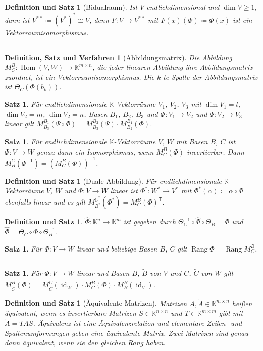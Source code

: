 \documentclass[a4paper]{article}
\newcounter{Sec}
\theoremstyle{marginbreak}
\newtheorem{satz}[definition]{Satz}
\newtheorem{defsatz}[definition]{Definition und Satz}
\newtheorem{defsatzver}[definition]{Definition, Satz und Verfahren}
\DeclareMathOperator{\Rang}{Rang}
\DeclareMathOperator{\Hom}{Hom}
\DeclareMathOperator{\id}{id}
\newcommand{\sep}{%
	\rule{\textwidth}{0.3pt}%
	\stepcounter{Sec}%
	}
\newcommand\transpose[1]{#1^{\mathsf{T}}}
\begin{document}
	\begin{defsatz}[Bidualraum]
		Ist $V$ endlichdimensional und $\dim V \geq 1$, dann ist $V^{**}\coloneqq(V^*)^*\cong V$,
		denn $F\colon V\to V^{**}$ mit $F(x)(\Phi)\coloneqq\Phi(x)$ ist ein Vektorraumisomorphismus.
	\end{defsatz}
	\sep
	\begin{defsatzver}[Abbildungsmatrix]
		Die Abbildung $M^B_C\colon\Hom(V, W)\to \mathbb{K}^{m\times n}$, die jeder
		linearen Abbildung ihre Abbildungsmatrix zuordnet, ist ein Vektorraumisomorphismus.
		Die $k$-te Spalte der Abbildungsmatrix ist $\Theta_C(\Phi(b_k))$.
	\end{defsatzver}
	\begin{satz}
		Für endlichdimensionale $\mathbb{K}$-Vektorräume $V_1$, $V_2$, $V_3$ mit $\dim V_1=l$, $\dim V_2=m$,
		$\dim V_2=n$, Basen $B_1$, $B_2$, $B_3$ und $\Phi\colon V_1\to V_2$ und
		$\Psi\colon V_2\to V_3$ linear gilt $M_{B_3}^{B_1}(\Psi\circ\Phi) = M_{B_3}^{B_2}(\Psi)\cdot M_{B_2}^{B_1}(\Phi)$.
	\end{satz}
	\begin{satz}
		Für endlichdimensionale $\mathbb{K}$-Vektorräume $V$, $W$ mit Basen $B$, $C$ ist
		$\Phi\colon V\to W$ genau dann ein Isomorphismus, wenn $M_C^B(\Phi)$ invertierbar.
		Dann $M_B^C(\Phi^{-1}) = (M_C^B(\Phi))^{-1}$.
	\end{satz}
	\begin{defsatz}[Duale Abbildung]
		Für endlichdimensionale $\mathbb{K}$-Vektorräume $V$, $W$ und $\Phi\colon V\to W$
		linear ist $\Phi^*\colon W^*\to V^*$ mit $\Phi^*(\alpha)\coloneqq\alpha\circ\Phi$
		ebenfalls linear und es gilt $M_{B^*}^{C^*}(\Phi^*) = \transpose{M_C^B(\Phi)}$.
	\end{defsatz}
	\begin{defsatz}
		$\hat{\Phi}\colon\mathbb{K}^n\to\mathbb{K}^m$ ist gegeben durch
		$\Theta_C^{-1}\circ\hat{\Phi}\circ\Theta_B=\Phi$ und $\hat{\Phi}=\Theta_C\circ\Phi\circ\Theta_B^{-1}$.
	\end{defsatz}
	\begin{satz}
		Für $\Phi\colon V\to W$ linear und beliebige Basen $B$, $C$ gilt $\Rang\Phi=\Rang M_C^B$.
	\end{satz}
	\sep
	\begin{satz}
		Für $\Phi\colon V\to W$ linear und Basen $B$, $\tilde{B}$ von $V$ und
		$C$, $\tilde{C}$ von $W$ gilt $M_{\tilde{C}}^{\tilde{B}}(\Phi) = M_{\tilde{C}}^C(\id_W)\cdot M_C^B(\Phi)\cdot M_B^{\tilde{B}}(\id_V)$.
	\end{satz}
	\begin{defsatz}[Äquivalente Matrizen]
		Matrizen $A, \tilde{A} \in \mathbb{K}^{m\times n}$ heißen äquivalent, wenn es
		invertierbare Matrizen $S \in \mathbb{K}^{n\times n}$ und $T \in \mathbb{K}^{m\times m}$
		gibt mit $\tilde{A}=TAS$. Äquivalenz ist eine Äquivalenzrelation und elementare
		Zeilen- und Spaltenumformungen geben eine äquivalente Matrix. Zwei Matrizen sind
		genau dann äquivalent, wenn sie den gleichen Rang haben.
	\end{defsatz}
\end{document}
